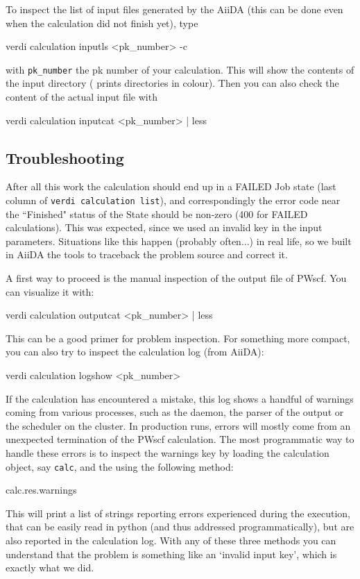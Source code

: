 To inspect the list of input files generated by the AiiDA (this can be done even
when the calculation did not finish yet), type
\begin{bashcommand}
 verdi calculation inputls <pk_number> -c
\end{bashcommand}
with \texttt{pk\_number} the pk number of your calculation. This will show the contents of the input directory ( prints directories in colour). Then you can also check the content of the actual input file with
\begin{bashcommand}
 verdi calculation inputcat <pk_number> | less
\end{bashcommand}














\subsection{Troubleshooting}
After all this work the calculation should end up in a FAILED Job state (last column of
\texttt{verdi calculation list}), and 
correspondingly the error code near the ``Finished" status of the State should be non-zero
(400 for FAILED calculations). This was expected, since we used an invalid key in the input parameters.
Situations like this happen (probably often...) in real life, so we built in AiiDA the tools to traceback the problem source and correct it.

A first way to proceed is the manual inspection of the output file of PWscf. You can visualize it with:
\begin{bashcommand}
 verdi calculation outputcat <pk_number> | less
\end{bashcommand}
This can be a good primer for problem inspection.
For something more compact, you can also try to inspect the calculation log (from AiiDA):
\begin{bashcommand}
 verdi calculation logshow <pk_number>
\end{bashcommand}
If the calculation has encountered a mistake, this log shows a handful of warnings coming from various processes, such as the daemon, the parser of the output or the scheduler on the cluster.
In production runs, errors will mostly come from an unexpected termination of the PWscf calculation.
The most programmatic way to handle these errors is to inspect the warnings key by loading the calculation object, say \texttt{calc}, and the using the following method:
\begin{pythoncommand}
calc.res.warnings
\end{pythoncommand}
This will print a list of strings reporting errors experienced during the execution, that can be easily read in python (and thus addressed programmatically), but are also reported in the calculation log.
With any of these three methods you can understand that the problem is something like an `invalid input key', which is exactly what we did.

